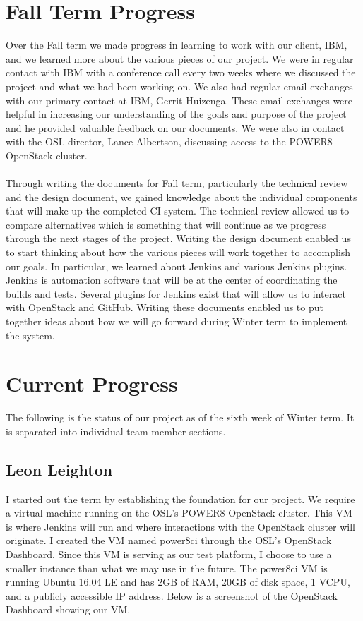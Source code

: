 \documentclass[10pt,onecolumn,journal,draftclsnofoot]{IEEEtran}
\begin{document}
\section{Fall Term Progress}
Over the Fall term we made progress in learning to work with our client, IBM, and we learned more about the various pieces of our project.
We were in regular contact with IBM with a conference call every two weeks where we discussed the project and what we had been working on.
We also had regular email exchanges with our primary contact at IBM, Gerrit Huizenga.
These email exchanges were helpful in increasing our understanding of the goals and purpose of the project and he provided valuable feedback on our documents.
We were also in contact with the OSL director, Lance Albertson, discussing access to the POWER8 OpenStack cluster.
\\
\\
Through writing the documents for Fall term, particularly the technical review and the design document, we gained knowledge about the individual components that will make up the completed CI system.
The technical review allowed us to compare alternatives which is something that will continue as we progress through the next stages of the project.
Writing the design document enabled us to start thinking about how the various pieces will work together to accomplish our goals.
In particular, we learned about Jenkins and various Jenkins plugins.
Jenkins is automation software that will be at the center of coordinating the builds and tests.
Several plugins for Jenkins exist that will allow us to interact with OpenStack and GitHub.
Writing these documents enabled us to put together ideas about how we will go forward during Winter term to implement the system.

\section{Current Progress}
The following is the status of our project as of the sixth week of Winter term. It is separated into individual team member sections.
\subsection{Leon Leighton}
I started out the term by establishing the foundation for our project.
We require a virtual machine running on the OSL's POWER8 OpenStack cluster.
This VM is where Jenkins will run and where interactions with the OpenStack cluster will originate.
I created the VM named power8ci through the OSL's OpenStack Dashboard.
Since this VM is serving as our test platform, I choose to use a smaller instance than what we may use in the future.
The power8ci VM is running Ubuntu 16.04 LE and has 2GB of RAM, 20GB of disk space, 1 VCPU, and a publicly accessible IP address.
Below is a screenshot of the OpenStack Dashboard showing our VM\@.
\end{document}
